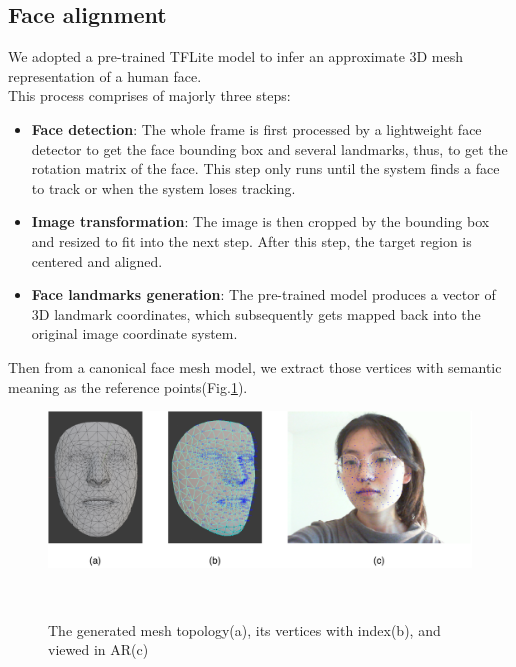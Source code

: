 \subsection{Face alignment}
\label{sec:implement-face-alignment}
We adopted a pre-trained TFLite model\cite{kartynnik2019real} to infer an approximate 3D mesh representation of a human face.\\
This process comprises of majorly three steps:
\begin{itemize}
    \item \textbf{Face detection}: The whole frame is first processed by a lightweight face detector to get the face bounding box and several landmarks, thus, to get the rotation matrix of the face. This step only runs until the system finds a face to track or when the system loses tracking.
    \item \textbf{Image transformation}: The image is then cropped by the bounding box and resized to fit into the next step. After this step, the target region is centered and aligned.
    \item \textbf{Face landmarks generation}: The pre-trained model produces a vector of 3D landmark coordinates, which subsequently gets mapped back into the original image coordinate system.
\end{itemize}
Then from a canonical face mesh model, we extract those vertices with semantic meaning as the reference points(Fig.\ref{fig:face_mesh}).
\begin{figure}
  \centering
    \includegraphics[width=0.9\columnwidth]{figures/facemesh.pdf}
    \caption{The generated mesh topology(a), its vertices with index(b), and viewed in AR(c)}~\label{fig:face_mesh}
  \end{figure}

